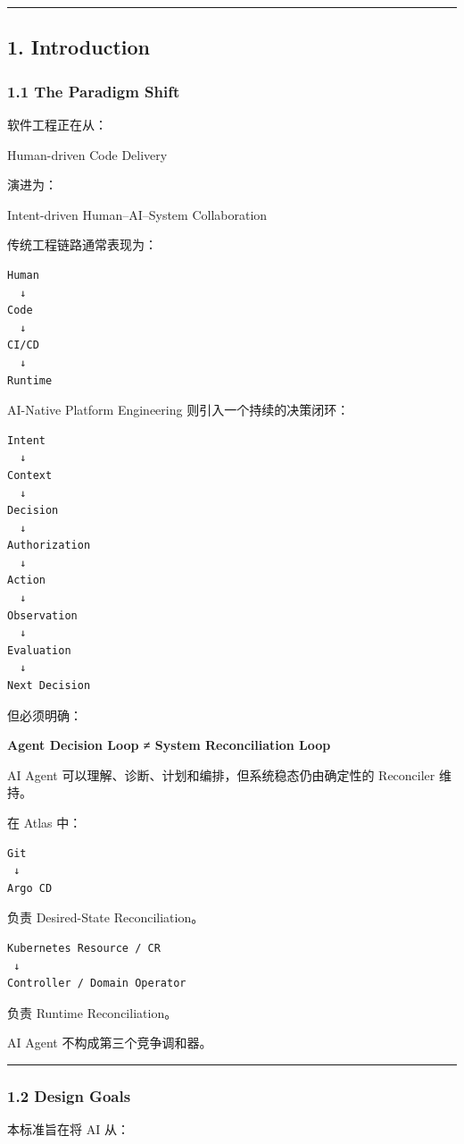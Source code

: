 \documentclass[11pt,a4paper]{article}
\begin{document}
\vspace{0.5em}\hrule\vspace{0.5em}
\subsection{1. Introduction}
\subsubsection{1.1 The Paradigm Shift}
软件工程正在从：

\begin{gfmBlockquote}
Human-driven Code Delivery
\end{gfmBlockquote}
演进为：

\begin{gfmBlockquote}
Intent-driven Human–AI–System Collaboration
\end{gfmBlockquote}
传统工程链路通常表现为：

\begin{lstlisting}[language=text]
Human
  ↓
Code
  ↓
CI/CD
  ↓
Runtime
\end{lstlisting}
AI-Native Platform Engineering 则引入一个持续的决策闭环：

\begin{lstlisting}[language=text]
Intent
  ↓
Context
  ↓
Decision
  ↓
Authorization
  ↓
Action
  ↓
Observation
  ↓
Evaluation
  ↓
Next Decision
\end{lstlisting}
但必须明确：

\begin{gfmBlockquote}
\textbf{Agent Decision Loop ≠ System Reconciliation Loop}
\end{gfmBlockquote}
AI Agent 可以理解、诊断、计划和编排，但系统稳态仍由确定性的 Reconciler 维持。

在 Atlas 中：

\begin{lstlisting}[language=text]
Git
 ↓
Argo CD
\end{lstlisting}
负责 Desired-State Reconciliation。

\begin{lstlisting}[language=text]
Kubernetes Resource / CR
 ↓
Controller / Domain Operator
\end{lstlisting}
负责 Runtime Reconciliation。

AI Agent 不构成第三个竞争调和器。

\vspace{0.5em}\hrule\vspace{0.5em}
\subsubsection{1.2 Design Goals}
本标准旨在将 AI 从：
\end{document}
